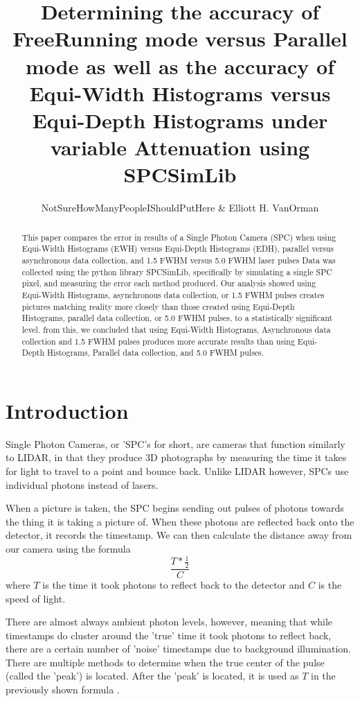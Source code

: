 \documentclass{article}
\title{Determining the accuracy of FreeRunning mode versus Parallel mode as well as the accuracy of Equi-Width Histograms versus Equi-Depth Histograms under variable Attenuation using SPCSimLib \cite{spc}}
\author{NotSureHowManyPeopleIShouldPutHere \& Elliott H. VanOrman}
\begin{document}
\maketitle

\begin{abstract}
This paper compares the error in results of a Single Photon Camera (SPC) when using Equi-Width Histograms (EWH) versus Equi-Depth Histograms (EDH), parallel versus asynchronous data collection, and 1.5 FWHM versus 5.0 FWHM laser pulses
Data was collected using the python library SPCSimLib, specifically by simulating a single SPC pixel, and measuring the error each method produced.
Our analysis showed using Equi-Width Histograms, asynchronous data collection, or 1.5 FWHM pulses creates pictures matching reality more closely than those created using Equi-Depth Histograms, parallel data collection, or 5.0 FWHM pulses, to a statistically significant level.
from this, we concluded that using Equi-Width Histograms, Asynchronous data collection and 1.5 FWHM pulses produces more accurate results than using Equi-Depth Histograms, Parallel data collection, and 5.0 FWHM pulses.
\end{abstract}

\section*{Introduction}

Single Photon Cameras, or 'SPC's for short, are cameras that function similarly to LIDAR, in that they produce 3D photographs by measuring the time it takes for light to travel to a point and bounce back. Unlike LIDAR however, SPCs use individual photons instead of lasers. \cite{ingle} \cite{sadekar}

When a picture is taken, the SPC begins sending out pulses of photons towards the thing it is taking a picture of. When these photons are reflected back onto the detector, it records the timestamp. We can then calculate the distance away from our camera using the formula\[\frac{T*\frac{1}{2}}{C}\] where $T$ is the time it took photons to reflect back to the detector and $C$ is the speed of light. \cite{sadekar}

There are almost always ambient photon levels, however, meaning that while timestamps do cluster around the 'true' time it took photons to reflect back, there are a certain number of 'noise' timestamps due to background illumination. There are multiple methods to determine when the true center of the pulse (called the 'peak') is located. After the 'peak' is located, it is used as $T$ in the previously shown formula \cite{sadekar}.
\end{document}
